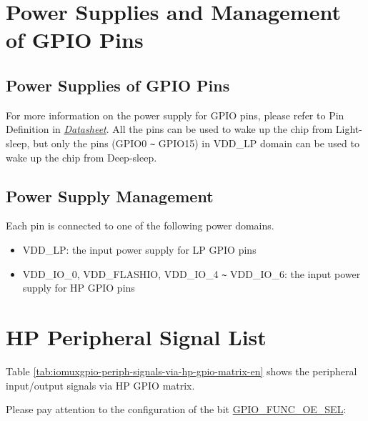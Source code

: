 \documentclass[main\_\_EN.tex]{subfiles}
\begin{document}
\section{Power Supplies and Management of GPIO Pins}\label{I/O Pad Power Supplies}

\subsection{Power Supplies of GPIO Pins}
For more information on the power supply for GPIO pins, please refer to Pin Definition in {\textit{\href{https://www.espressif.com/sites/default/files/documentation/esp32-p4_datasheet_en.pdf}{\chipname{} Datasheet}}}. All the pins can be used to wake up the chip from Light-sleep, but only the pins (GPIO0 \verb+~+ GPIO15) in VDD\_LP domain can be used to wake up the chip from Deep-sleep.

\subsection{Power Supply Management}

Each \chipname{} pin is connected to one of the following power domains.

\begin{itemize}
    \item VDD\_LP: the input power supply for LP GPIO pins
    \item VDD\_IO\_0, VDD\_FLASHIO, VDD\_IO\_4 \verb+~+ VDD\_IO\_6: the input power supply for HP GPIO pins
\end{itemize}

\section{HP Peripheral Signal List}
\label{sec:hp_peripheral_signals}

Table \ref{tab:iomuxgpio-periph-signals-via-hp-gpio-matrix-en} shows the peripheral input/output signals via HP GPIO matrix.

Please pay attention to the configuration of the bit \hyperref[fielddesc:GPIOFUNCNOESEL]{GPIO\_FUNC\_OE\_SEL}:
\end{document}
